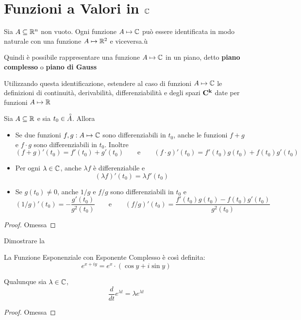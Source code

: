 \section{Funzioni a Valori in \texorpdfstring{$\protect\mathbb{C}$}{C}}
\label{sec:fun_in_C}
Sia $A \subseteq \mathbb{R}^n$ non vuoto. Ogni funzione $A \mapsto \mathbb{C}$ può essere identificata in modo naturale con una funzione $A \mapsto \mathbb{R}^2$ e viceversa.ù
\begin{note}
	Quindi è possibile rappresentare una funzione $A \mapsto \mathbb{C}$ in un piano, detto \textbf{piano complesso} o \textbf{piano di Gauss}
\end{note}
\begin{exercise}
	\label{ex:ext_def_in_C}
	Utilizzando questa identificazione, estendere al caso di funzioni $A \mapsto \mathbb{C}$ le definizioni di continuità, derivabilità, differenziabilità e degli spazi $\mathbf{C^{k}}$ date per funzioni $A \mapsto \mathbb{R}$
\end{exercise}
\begin{proposition}
	\label{prop:fg_in_C}
	Sia $A \subseteq \mathbb{R}$ e sia $t_0 \in \accentset{\circ}{A}$. Allora
	\begin{itemize}
		\item Se due funzioni $f,g: A \mapsto \mathbb{C}$ sono differenziabili in $t_0$, anche le funzioni $f+g$ e $f \cdot g$ sono differenziabili in $t_0$. Inoltre
			$$(f+g)'(t_0) = f'(t_0) + g'(t_0) \qquad\text{e}\qquad (f \cdot g)'(t_0) = f'(t_0)g(t_0)+f(t_0)g'(t_0)$$
		\item Per ogni $\lambda \in \mathbb{C}$, anche $\lambda f$ è differenziabile e
			$$(\lambda f)'(t_0) = \lambda f'(t_0)$$
		\item Se $g(t_0) \neq 0$, anche $1/g$ e $f/g$ sono differenziabili in $t_0$ e
			$$(1/g)'(t_0) = - \frac{g'(t_0)}{g^2(t_0)} \qquad\text{e}\qquad (f/g)'(t_0) = \frac{f'(t_0)g(t_0)-f(t_0)g'(t_0)}{g^2(t_0)}$$
	\end{itemize}
	\begin{proof}
		Omessa
	\end{proof}
\end{proposition}
\begin{exercise}
	Dimostrare la 
\end{exercise}
\begin{definition}
	La Funzione Esponenziale con Esponente Complesso è così definita:
	$$e^{x+iy} = e^x \cdot (\cos y + i \sin y)$$
\end{definition}
\begin{proposition}
	\label{prop:deriv_exp_in_C}
	Qualunque sia $\lambda \in \mathbb{C}$,
	$$\frac{d}{dt}e^{\lambda t} = \lambda e^{\lambda t}$$
	\begin{proof}
		Omessa
	\end{proof}
\end{proposition}
